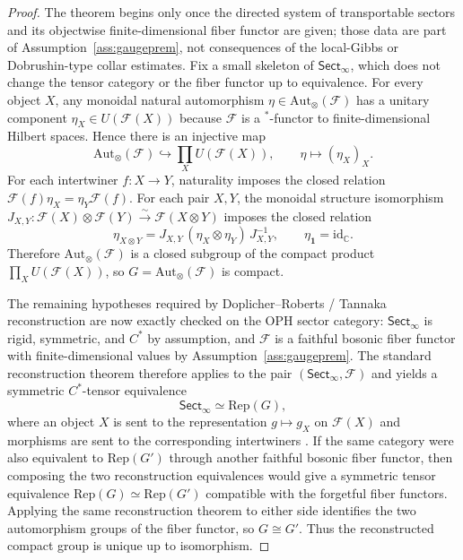 \documentclass[11pt]{article}
\begin{document}
\begin{proof}
The theorem begins only once the directed system of transportable sectors and its objectwise finite-dimensional fiber functor are given; those data are part of Assumption~\ref{ass:gaugeprem}, not consequences of the local-Gibbs or Dobrushin-type collar estimates. Fix a small skeleton of \(\mathsf{Sect}_\infty\), which does not change the tensor category or the fiber functor up to equivalence. For every object \(X\), any monoidal natural automorphism \(\eta\in\mathrm{Aut}_\otimes(\mathcal F)\) has a unitary component \(\eta_X\in U(\mathcal F(X))\) because \(\mathcal F\) is a \(^*\)-functor to finite-dimensional Hilbert spaces. Hence there is an injective map
\[
\mathrm{Aut}_\otimes(\mathcal F)\hookrightarrow \prod_{X}U(\mathcal F(X)),\qquad
\eta\mapsto (\eta_X)_X.
\]
For each intertwiner \(f:X\to Y\), naturality imposes the closed relation \(\mathcal F(f)\eta_X=\eta_Y\mathcal F(f)\). For each pair \(X,Y\), the monoidal structure isomorphism \(J_{X,Y}:\mathcal F(X)\otimes\mathcal F(Y)\xrightarrow{\sim}\mathcal F(X\otimes Y)\) imposes the closed relation
\[
\eta_{X\otimes Y}=J_{X,Y}\,(\eta_X\otimes\eta_Y)\,J_{X,Y}^{-1},
\qquad
\eta_{\mathbf 1}=\mathrm{id}_{\mathbb C}.
\]
Therefore \(\mathrm{Aut}_\otimes(\mathcal F)\) is a closed subgroup of the compact product \(\prod_X U(\mathcal F(X))\), so \(G=\mathrm{Aut}_\otimes(\mathcal F)\) is compact.

The remaining hypotheses required by Doplicher--Roberts / Tannaka reconstruction are now exactly checked on the OPH sector category: \(\mathsf{Sect}_\infty\) is rigid, symmetric, and \(C^*\) by assumption, and \(\mathcal F\) is a faithful bosonic fiber functor with finite-dimensional values by Assumption~\ref{ass:gaugeprem}. The standard reconstruction theorem therefore applies to the pair \((\mathsf{Sect}_\infty,\mathcal F)\) and yields a symmetric \(C^*\)-tensor equivalence
\[
\mathsf{Sect}_\infty \simeq \mathrm{Rep}(G),
\]
where an object \(X\) is sent to the representation \(g\mapsto g_X\) on \(\mathcal F(X)\) and morphisms are sent to the corresponding intertwiners \cite{dr89,dr90}. If the same category were also equivalent to \(\mathrm{Rep}(G')\) through another faithful bosonic fiber functor, then composing the two reconstruction equivalences would give a symmetric tensor equivalence \(\mathrm{Rep}(G)\simeq\mathrm{Rep}(G')\) compatible with the forgetful fiber functors. Applying the same reconstruction theorem to either side identifies the two automorphism groups of the fiber functor, so \(G\cong G'\). Thus the reconstructed compact group is unique up to isomorphism.
\end{proof}
\end{document}
